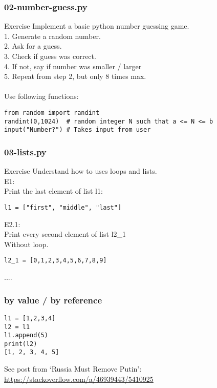 \documentclass{beamer}
\begin{document}
\begin{frame}[fragile]
    \frametitle{02-number-guess.py}
    \begin{exampleblock}{Exercise}
Implement a basic python number guessing game.\\
1. Generate a random number.\\
2. Ask for a guess.\\
3. Check if guess was correct.\\
4. If not, say if number was smaller / larger\\
5. Repeat from step 2, but only 8 times max.\\
~\\
Use following functions:
        \begin{verbatim}
from random import randint
randint(0,1024)  # random integer N such that a <= N <= b
input("Number?") # Takes input from user
        \end{verbatim}
    \end{exampleblock}
\end{frame}


\begin{frame}[fragile]
    \frametitle{03-lists.py}
    \begin{exampleblock}{Exercise}
        Understand how to uses loops and lists.\\
E1:\\
Print the last element of list l1:
\begin{verbatim}
l1 = ["first", "middle", "last"]
\end{verbatim}
E2.1:\\
Print every second element of list l2\_1\\
Without loop.
\begin{verbatim}
l2_1 = [0,1,2,3,4,5,6,7,8,9]
\end{verbatim}
....
    \end{exampleblock}
\end{frame}

\begin{frame}[fragile]
    \frametitle{by value / by reference}
        \begin{example}
            \begin{verbatim}
l1 = [1,2,3,4]
l2 = l1
l1.append(5)
print(l2)
[1, 2, 3, 4, 5]
            \end{verbatim}
        \end{example}

See post from `Russia Must Remove Putin': \url{https://stackoverflow.com/a/46939443/5410925}

\end{frame}
\end{document}
